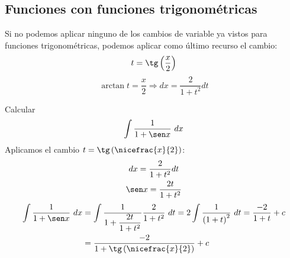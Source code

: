 \subsection{Funciones con funciones trigonométricas}
Si no podemos aplicar ninguno de los cambios de variable ya vistos para funciones trigonométricas, podemos aplicar como último recurso el cambio:
\begin{equation*}
    t = \tg\left(\dfrac{x}{2}\right)
\end{equation*}
\begin{equation*}
    \arctan t = \dfrac{x}{2} \Longrightarrow dx = \dfrac{2}{1+t^2}dt
\end{equation*}

\begin{ejemplo}
    Calcular
    \begin{equation*}
        \displaystyle\int \dfrac{1}{1+\sen x}~dx 
    \end{equation*}
    Aplicamos el cambio $t = \tg\left(\nicefrac{x}{2}\right)$:
    \begin{gather*}
        dx = \dfrac{2}{1+t^2}dt\\
        \sen x = \dfrac{2t}{1+t^2}
    \end{gather*}
    \begin{align*}
        \displaystyle\int \dfrac{1}{1+\sen x}~dx &= \displaystyle\int \dfrac{1}{1+\dfrac{2t}{1+t^2}}\dfrac{2}{1+t^2}~dt = 2\displaystyle\int \dfrac{1}{{(1+t)}^{2}}~dt = \dfrac{-2}{1+t}+c \\
        &= \dfrac{-2}{1+\tg\left(\nicefrac{x}{2}\right)} + c
    \end{align*}
\end{ejemplo}
